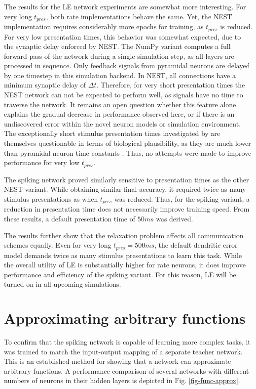 The results for the LE network experiments are somewhat more interesting. For very long $t_{pres}$, both rate
implementations behave the same. Yet, the NEST implementation requires considerably more epochs for training, as
$t_{pres}$ is reduced. For very low presentation times, this behavior was somewhat expected, due to the synaptic delay
enforced by NEST. The NumPy variant computes a full forward pass of the network during a single simulation step, as all
layers are processed in sequence. Only feedback signals from pyramidal neurons are delayed by one timestep in this
simulation backend. In NEST, all connections have a minimum synaptic delay of $\Delta t$. Therefore, for very short
presentation times the NEST network can not be expected to perform well, as signals have no time to traverse the
network. It remains an open question whether this feature alone explains the gradual decrease in performance observed
here, or if there is an undiscovered error within the novel neuron models or simulation environment. The exceptionally
short stimulus presentation times investigated by \citep{Haider2021} are themselves questionable in terms of biological
plausibility, as they are much lower than pyramidal neuron time constants \citep{McCormick1985}. Thus, no attempts were
made to improve performance for very low $t_{pres}$.

The spiking network proved similarly sensitive to presentation times as the other NEST variant. While obtaining similar
final accuracy, it required twice as many stimulus presentations as when $t_{pres}$ was reduced. Thus, for the spiking
variant, a reduction in presentation time does not necessarily improve training speed. From these results, a default
presentation time of $50ms$ was derived.


The results further show that the relaxation problem affects all communication schemes equally. Even for very long
$t_{pres} = 500ms$, the default dendritic error model demands twice as many stimulus presentations to learn this task.
While the overall utility of LE is substantially higher for rate neurons, it does improve performance and efficiency of
the spiking variant. For this reason, LE will be turned on in all upcoming simulations.

\section{Approximating arbitrary functions}\label{sec-func-approx}

To confirm that the spiking network is capable of learning more complex tasks, it was trained to match the input-output
mapping of a separate teacher network. This is an established method for showing that a network can approximate
arbitrary functions. A performance comparison of several networks with different numbers of neurons in their hidden
layers is depicted in Fig. \ref{fig-func-approx}.


